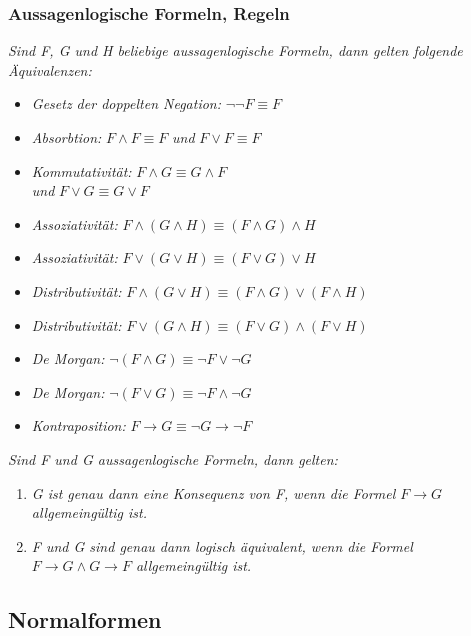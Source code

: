\subsubsection{Aussagenlogische Formeln, Regeln}%
\label{ssub:aussagenlog_formeln_regeln}
\textit{Sind F, G und H beliebige aussagenlogische Formeln, dann gelten folgende Äquivalenzen:}
\begin{itemize}
	\item \textit{Gesetz der doppelten Negation: } $\neg\neg F \equiv F$
	\item \textit{Absorbtion: } $F \land F  \equiv F$ \textit{ und } $F \lor  F \equiv F$
	\item \textit{Kommutativität: } $F \land G \equiv G \land F$ \\ \textit{ und } $F \lor G \equiv G \lor F$
	\item \textit{Assoziativität: } $F \land (G \land H) \equiv (F \land G) \land H$
	\item \textit{Assoziativität: } $F \lor (G \lor H) \equiv (F \lor G) \lor H$
	\item \textit{Distributivität: } $F \land (G \lor H) \equiv (F \land G) \lor (F \land H)$
	\item \textit{Distributivität: } $F \lor (G \land H) \equiv (F \lor G) \land (F \lor H)$
	\item \textit{De Morgan: } $\neg(F \land G) \equiv \neg F \lor \neg G$
	\item \textit{De Morgan: } $\neg (F \lor G) \equiv \neg F \land \neg G$
	\item \textit{Kontraposition: } $F \rightarrow G \equiv \neg G \rightarrow \neg F$ 
\end{itemize}

\textit{Sind F und G aussagenlogische Formeln, dann gelten:}
\begin{enumerate}
 \item \textit{G ist genau dann eine Konsequenz von F, wenn die Formel $F \rightarrow G$ allgemeingültig ist.}
 \item \textit{F und G sind genau dann logisch äquivalent, wenn die Formel $F \rightarrow G \land G \rightarrow F$ allgemeingültig ist.}
\end{enumerate}

\subsection{Normalformen}%
\label{sub:normalformen}

